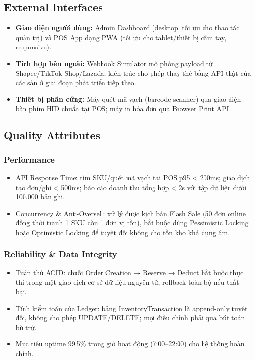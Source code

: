 \subsection{External Interfaces}
\begin{itemize}
    \item \textbf{Giao diện người dùng:} Admin Dashboard (desktop, tối ưu cho thao tác quản trị) và POS App dạng PWA (tối ưu cho tablet/thiết bị cầm tay, responsive).
    \item \textbf{Tích hợp bên ngoài:} Webhook Simulator mô phỏng payload từ Shopee/TikTok Shop/Lazada; kiến trúc cho phép thay thế bằng API thật của các sàn ở giai đoạn phát triển tiếp theo.
    \item \textbf{Thiết bị phần cứng:} Máy quét mã vạch (barcode scanner) qua giao diện bàn phím HID chuẩn tại POS; máy in hóa đơn qua Browser Print API.
\end{itemize}

\subsection{Quality Attributes}

\subsubsection{Performance}
\begin{itemize}
    \item API Response Time: tìm SKU/quét mã vạch tại POS p95 < 200ms; giao dịch tạo đơn/ghi < 500ms; báo cáo doanh thu tổng hợp < 2s với tập dữ liệu dưới 100.000 bản ghi.
    \item Concurrency \& Anti-Oversell: xử lý được kịch bản Flash Sale (50 đơn online đồng thời tranh 1 SKU còn 1 đơn vị tồn), bắt buộc dùng Pessimistic Locking hoặc Optimistic Locking để tuyệt đối không cho tồn kho khả dụng âm.
\end{itemize}

\subsubsection{Reliability \& Data Integrity}
\begin{itemize}
    \item Tuân thủ ACID: chuỗi Order Creation → Reserve → Deduct bắt buộc thực thi trong một giao dịch cơ sở dữ liệu nguyên tử, rollback toàn bộ nếu thất bại.
    \item Tính kiểm toán của Ledger: bảng InventoryTransaction là append-only tuyệt đối, không cho phép UPDATE/DELETE; mọi điều chỉnh phải qua bút toán bù trừ.
    \item Mục tiêu uptime 99.5\% trong giờ hoạt động (7:00--22:00) cho hệ thống hoàn chỉnh.
\end{itemize}

